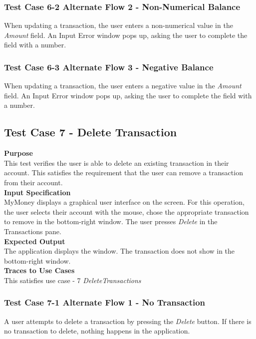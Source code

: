 \documentclass[12pt]{article}
\begin{document}
\subsubsection
{Test Case 6-2 Alternate Flow 2 - Non-Numerical Balance}
When updating a transaction, the user enters a non-numerical value in the \textit{Amount} field. 
An Input Error window pops up, asking the user to complete the field with a number. 

\subsubsection
{Test Case 6-3 Alternate Flow 3 - Negative Balance}
When updating a transaction, the user enters a negative value in the \textit{Amount} field. 
An Input Error window pops up, asking the user to complete the field with a number. 

\clearpage 


\subsection{Test Case 7 - Delete Transaction} \label{TC-7}
\noindent
{\bf Purpose}\\
This test verifies the user is able to delete an existing transaction in their account.
This satisfies the requirement that the user can remove a transaction from their account.\\
                                                    
\noindent
{\bf Input Specification}\\
MyMoney displays a graphical user interface on the screen.
For this operation, the user selects their account with the mouse,
chose the appropriate transaction to remove in the bottom-right window.
The user presses \textit{Delete} in the Transactions pane.\\
                                                         
\noindent
{\bf Expected Output}\\
The application displays the window.       
The transaction does not show in the bottom-right window.\\

\noindent
{\bf Traces to Use Cases}\\
This satisfies use case  - 7 \textit{DeleteTransactions}\\

\subsubsection
{Test Case 7-1 Alternate Flow 1 - No Transaction}
A user attempts to delete a transaction by pressing the \textit{Delete} button. If there is no transaction to delete, nothing happens in the application.
\end{document}

